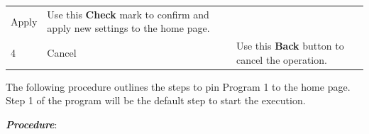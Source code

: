 \begin{longtable}[]{@{}lll@{}}
\begin{minipage}[t]{0.23\columnwidth}
Apply\strut
\end{minipage} & \begin{minipage}[t]{0.65\columnwidth}\raggedright
Use this \textbf{Check} mark to confirm and apply new settings to the
home page.\strut
\end{minipage}\tabularnewline
\begin{minipage}[t]{0.04\columnwidth}\raggedright
4\strut
\end{minipage} & \begin{minipage}[t]{0.23\columnwidth}\raggedright
Cancel\strut
\end{minipage} & \begin{minipage}[t]{0.65\columnwidth}\raggedright
Use this \textbf{Back} button to cancel the operation.\strut
\end{minipage}\tabularnewline
\bottomrule
\end{longtable}

The following procedure outlines the steps to pin Program 1 to the home
page. Step 1 of the program will be the default step to start the
execution.

\textbf{\emph{Procedure}}:

